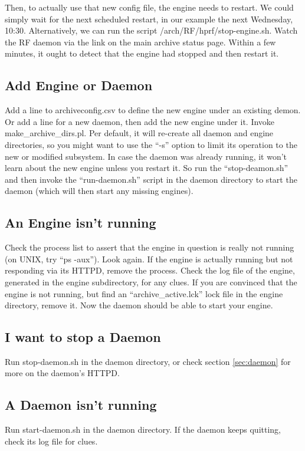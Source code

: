 Then, to actually use that new config file, the engine needs to
restart. We could simply wait for the next scheduled restart, in our
example the next Wednesday, 10:30. Alternatively, we can run the
script /arch/RF/hprf/stop-engine.sh.
Watch the RF daemon via the link on the main archive status page.
Within a few minutes, it ought to detect that the engine had stopped
and then restart it.

\subsection{Add Engine or Daemon}
Add a line to archiveconfig.csv to define the new engine under an
existing demon. Or add a line for a new daemon, then add the new
engine under it. Invoke  make\_archive\_dirs.pl. Per default, it will
re-create all daemon and engine directories, so you might want to use
the ``-s'' option to limit its operation to the new or modified
subsystem.
In case the daemon was already running, it won't learn about the new
engine unless you restart it. So run the ``stop-deamon.sh'' and then
invoke the ``run-daemon.sh'' script in the daemon directory to start
the daemon (which will then start any missing engines).

\subsection{An Engine isn't running}
Check the process list to assert that the engine in question is really not
running (on UNIX, try ``ps -aux''). Look again. If the engine is
actually running but not responding via its HTTPD, remove the process.
Check the log file of the engine, generated in the engine
subdirectory, for any clues. If you are convinced that the engine is
not running, but find an ``archive\_active.lck'' lock file in the
engine directory, remove it. Now the daemon should be able to start
your engine.  

\subsection{I want to stop a Daemon}
Run stop-daemon.sh in the daemon directory, or check section
\ref{sec:daemon} for more on the daemon's HTTPD.

\subsection{A Daemon isn't running}
Run start-daemon.sh in the daemon directory. If the daemon keeps quitting,
check its log file for clues.

